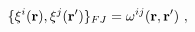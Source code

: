 \begin{equation}
\{\xi ^{i}({\bf r}),\xi ^{j}({\bf r^{\prime }})\}_{FJ}=\omega ^{ij}({\bf r},%
{\bf r^{\prime }})\ ,
\end{equation}%
